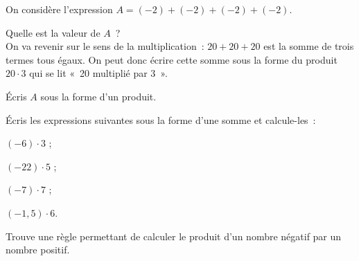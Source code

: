 \begin{activite} \label{MultDivRelatifs_acti1}

On considère l'expression $A = (- 2) + (- 2) + (- 2) + (- 2)$.

\begin{partie}
Quelle est la valeur de $A$ ? \\[0.5em]
On va revenir sur le sens de la multiplication : $20 + 20 + 20$ est la somme de trois termes tous égaux. On peut donc écrire cette somme sous la forme du produit $20 \cdot 3$ qui se lit « 20 multiplié par 3 ».
\end{partie}

\begin{partie}
Écris $A$ sous la forme d'un produit.
 \end{partie}
 
\begin{partie} 
Écris les expressions suivantes sous la forme d'une somme et calcule-les :
 \begin{colenumerate}{4}
  \item $(- 6) \cdot 3$ ;
  \item $(- 22) \cdot 5$ ;
  \item $(- 7) \cdot 7$ ;
  \item $(- 1,5) \cdot 6$.
  \end{colenumerate}
 \end{partie}
 
\begin{partie} \label{MultDivRelatifs_acti2}
Trouve une règle permettant de calculer le produit d'un nombre négatif par un nombre positif.
 \end{partie}

\end{activite}


